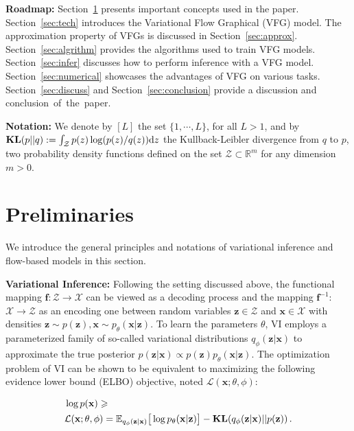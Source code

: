 \documentclass[sigconf, anonymous, review]{acmart}
\theoremstyle{plain}
\theoremstyle{definition}
\theoremstyle{remark}
\begin{document}
\vspace{0.1in}

\noindent\textbf{Roadmap:} Section~\ref{sec:prelim} presents important concepts used in the paper.
Section~\ref{sec:tech} introduces the Variational Flow Graphical  (VFG) model. The approximation property of VFGs is discussed in Section~\ref{sec:approx}. 
Section~\ref{sec:algrithm} provides the algorithms used to train VFG models. 
Section~\ref{sec:infer} discusses how to perform inference with a  VFG model. Section~\ref{sec:numerical} showcases the advantages of VFG on various tasks. Section~\ref{sec:discuss} and Section~\ref{sec:conclusion} provide a discussion and conclusion~of~the~paper.

\vspace{0.05in}

\noindent\textbf{Notation:} We denote by $[L]$ the set $ \{1, \cdots, L\}$, for all $L >1$, and by $\textbf{\text{KL}}(p || q ) := \int_{\mathcal{Z}} p(z) \log(p(z)/q(z)) \mathrm{d}z$ the Kullback-Leibler divergence from $q$ to $p$, two probability density functions defined on the set $\mathcal{Z} \subset \mathbb{R}^m$ for any dimension $m >0$.

\section{Preliminaries}\label{sec:prelim}

We introduce the general principles and notations of  variational inference  and  flow-based models in this section.

\textbf{Variational Inference:}
Following the setting discussed above, the functional mapping $\mathbf{f}: \mathcal{Z} \xrightarrow{} \mathcal{X} $ can be viewed as a decoding process and the mapping $\mathbf{f}^{-1}$: $ \mathcal{X} \xrightarrow{}  \mathcal{Z}$ as an encoding one between  random variables $\mathbf{z} \in \mathcal{Z}$  and $\mathbf{x} \in \mathcal{X}$ with densities $\mathbf{z} \sim p(\mathbf{z}), \mathbf{x} \sim p_{\theta}(\mathbf{x}|\mathbf{z}).$
To learn the parameters $\theta$, VI employs a parameterized family of so-called variational distributions $q_{\phi}(\mathbf{z}|\mathbf{x})$ to approximate the true posterior $p(\mathbf{z}|\mathbf{x}) \varpropto  p(\mathbf{z})  p_{\theta}(\mathbf{x}|\mathbf{z})$.
The optimization problem of VI can be shown to be equivalent to maximizing the following evidence lower bound (ELBO) objective, noted $\mathcal{L}(\mathbf{x}; \theta, \phi)$: 

\vspace{-0.15in}
\begin{align}\label{eq:vi_elbo}
 & \log p(\mathbf{x})
    \geqslant \\ \notag
&\mathcal{L}(\mathbf{x}; \theta, \phi) =\mathbb{E}_{q_{\phi}(\mathbf{z}|\mathbf{x})} \big[\log p_{\theta}(\mathbf{x}|\mathbf{z}) \big] - \textbf{\text{KL}}(q_{\phi}(\mathbf{z}|\mathbf{x})||p(\mathbf{z}))  \, .
\end{align}
\vspace{-0.15in}
\end{document}
